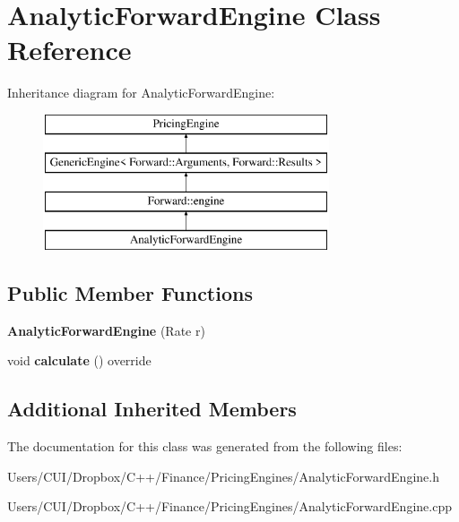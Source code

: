 \hypertarget{class_analytic_forward_engine}{}\section{Analytic\+Forward\+Engine Class Reference}
\label{class_analytic_forward_engine}
Inheritance diagram for Analytic\+Forward\+Engine\+:\begin{figure}[H]
\begin{center}
\leavevmode
\includegraphics[height=4.000000cm]{class_analytic_forward_engine}
\end{center}
\end{figure}
\subsection*{Public Member Functions}
\begin{DoxyCompactItemize}
\item 
\hypertarget{class_analytic_forward_engine_a7745431773dc2910c8aa01183b7780d0}{}\label{class_analytic_forward_engine_a7745431773dc2910c8aa01183b7780d0} 
{\bfseries Analytic\+Forward\+Engine} (Rate r)
\item 
\hypertarget{class_analytic_forward_engine_a12d6791a13bf727d43ffcff9cb55b094}{}\label{class_analytic_forward_engine_a12d6791a13bf727d43ffcff9cb55b094} 
void {\bfseries calculate} () override
\end{DoxyCompactItemize}
\subsection*{Additional Inherited Members}


The documentation for this class was generated from the following files\+:\begin{DoxyCompactItemize}
\item 
Users/\+C\+U\+I/\+Dropbox/\+C++/\+Finance/\+Pricing\+Engines/Analytic\+Forward\+Engine.\+h\item 
Users/\+C\+U\+I/\+Dropbox/\+C++/\+Finance/\+Pricing\+Engines/Analytic\+Forward\+Engine.\+cpp\end{DoxyCompactItemize}
